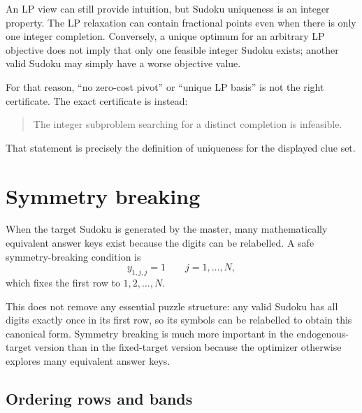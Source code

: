 \documentclass[11pt]{article}
\newcommand{\target}{y}
\begin{document}
An LP view can still provide intuition, but Sudoku uniqueness is an integer property. The LP relaxation can contain fractional points even when there is only one integer completion. Conversely, a unique optimum for an arbitrary LP objective does not imply that only one feasible integer Sudoku exists; another valid Sudoku may simply have a worse objective value.

For that reason, ``no zero-cost pivot'' or ``unique LP basis'' is not the right certificate. The exact certificate is instead:
\begin{quote}
The integer subproblem searching for a distinct completion is infeasible.
\end{quote}
That statement is precisely the definition of uniqueness for the displayed clue set.

\section{Symmetry breaking}

When the target Sudoku is generated by the master, many mathematically equivalent answer keys exist because the digits can be relabelled. A safe symmetry-breaking condition is
\begin{equation}
\target_{1,j,j}=1
\qquad j=1,\ldots,N,
\end{equation}
which fixes the first row to $1,2,\ldots,N$.

This does not remove any essential puzzle structure: any valid Sudoku has all digits exactly once in its first row, so its symbols can be relabelled to obtain this canonical form. Symmetry breaking is much more important in the endogenous-target version than in the fixed-target version because the optimizer otherwise explores many equivalent answer keys.

\subsection{Ordering rows and bands}
\end{document}
